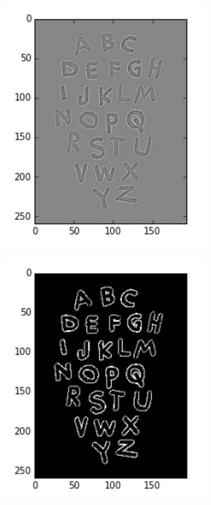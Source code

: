 \documentclass{article}
\begin{document}
		\begin{figure}[H]
			\begin{minipage}{.5\textwidth}
				\centering
				\includegraphics[width=0.6\linewidth]{images/log.png}
				\label{fig:test14}
			\end{minipage}
			\begin{minipage}{.5\textwidth}
				\centering
				\includegraphics[width=0.6\linewidth]{images/log_threshold.png}
				\label{fig:test15}
			\end{minipage}
		\end{figure}
\end{document}
